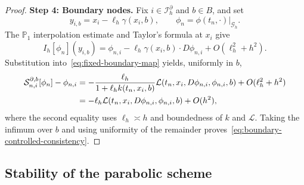 \documentclass[11pt]{article}
\theoremstyle{definition}
\theoremstyle{remark}
\newcommand{\cG}{\mathcal{G}}
\newcommand{\cS}{\mathcal{S}}
\begin{document}
\begin{proof}
		\medskip
		\noindent\textbf{Step 4: Boundary nodes.}
		Fix $i\in\mathcal I_h^\partial$ and $b\in B$, and set
		\[
		y_{i,b}=x_i-\ell_h\gamma(x_i,b),\qquad
		\phi_n=\phi(t_n,\cdot)|_{\cG_h}.
		\]
		The $\mathbb P_1$ interpolation estimate and Taylor's formula at $x_i$
		give
		\[
		I_h[\phi_n](y_{i,b})
		=\phi_{n,i}-\ell_h\gamma(x_i,b)\cdot D\phi_{n,i}
		+O(\ell_h^2+h^2).
		\]
		Substitution into~\eqref{eq:fixed-boundary-map} yields, uniformly in $b$,
		\begin{align}
			\cS_{n,i}^{\partial,b}[\phi_n]-\phi_{n,i}
			&=-\frac{\ell_h}{1+\ell_h k(t_n,x_i,b)}
			\mathcal L(t_n,x_i,D\phi_{n,i},\phi_{n,i},b)
			+O(\ell_h^2+h^2)
			\notag\\
			&=-\ell_h\mathcal L(t_n,x_i,D\phi_{n,i},\phi_{n,i},b)+O(h^2),
			\label{eq:boundary-fixed-consistency}
		\end{align}
		where the second equality uses $\ell_h\asymp h$ and boundedness of $k$ and
		$\mathcal L$.  Taking the infimum over $b$ and using uniformity of the
		remainder proves~\eqref{eq:boundary-controlled-consistency}.
	\end{proof}
	
	\subsection{Stability of the parabolic scheme}
	
\end{document}
